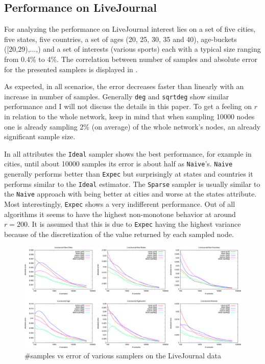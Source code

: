 \subsection{Performance on LiveJournal}
For analyzing the performance on LiveJournal interest lies on a set of five cities, five states, five countries, a set of ages (20, 25, 30, 35 and 40), age-buckets ([20,29),...,) and a set of interests (various sports) each with a typical size ranging from 0.4\% to 4\%.
The correlation between number of samples and absolute error for the presented samplers is displayed in .

As expected, in all scenarios, the error decreases faster than linearly with an increase in number of samples.
Generally \texttt{deg} and \texttt{sqrtdeg} show similar performance and I will not discuss the details in this paper.
To get a feeling on $r$ in relation to the whole network, keep in mind that when sampling 10000 nodes one is already sampling 2\% (on average) of the whole network's nodes, an already significant sample size.

In all attributes the \texttt{Ideal} sampler shows the best performance, for example in cities, until about 10000 samples its error is about half as \texttt{Naive}'s.
\texttt{Naive} generally performs better than \texttt{Expec} but surprisingly at states and countries it performs similar to the \texttt{Ideal} estimator.
The \texttt{Sparse} sampler is usually similar to the \texttt{Naive} approach with being better at cities and worse at the states attribute.
Most interestingly, \texttt{Expec} shows a very indifferent performance. Out of all algorithms it seems to have the highest non-monotone behavior at around $r=200$. It is assumed that this is due to \texttt{Expec} having the highest variance because of the discretization of the value returned by each sampled node.
\begin{figure}[!ht]
  \begin{center}
    \includegraphics[width=\linewidth]{fig2_3}
    \caption{\#samples vs error of various samplers on the LiveJournal data \cite{dasgupta2012social}}
  \end{center}
\end{figure}
